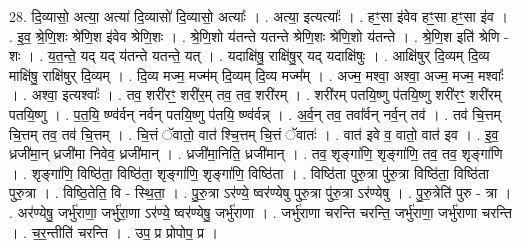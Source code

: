 \documentclass[17pt]{extarticle}
\begin{document}
28. दि॒व्यासो॒ अत्या॒ अत्या॑ दि॒व्यासो॑ दि॒व्यासो॒ अत्याः᳚ । . अत्या॒ इत्यत्याः᳚ । . हꣳ॒॒सा इ॑वेव हꣳ॒॒सा हꣳ॒॒सा इ॑व । . इ॒व॒ श्रे॒णि॒शः श्रे॑णि॒श इ॑वेव श्रेणि॒शः । . श्रे॒णि॒शो य॑तन्ते यतन्ते श्रेणि॒शः श्रे॑णि॒शो य॑तन्ते । . श्रे॒णि॒श इति॑ श्रेणि - शः । . य॒त॒न्ते॒ यद् यद् य॑तन्ते यतन्ते॒ यत् । . यदाक्षि॑षु॒ राक्षि॑षु॒र् यद् यदाक्षि॑षुः । . आक्षि॑षुर् दि॒व्यम् दि॒व्य माक्षि॑षु॒ राक्षि॑षुर् दि॒व्यम् । . दि॒व्य मज्म॒ मज्म॑म् दि॒व्यम् दि॒व्य मज्म᳚म् । . अज्म॒ मश्वा॒ अश्वा॒ अज्म॒ मज्म॒ मश्वाः᳚ । . अश्वा॒ इत्यश्वाः᳚ । . तव॒ शरी॑रꣳ॒॒ शरी॑र॒म् तव॒ तव॒ शरी॑रम् । . शरी॑रम् पतयि॒ष्णु प॑तयि॒ष्णु शरी॑रꣳ॒॒ शरी॑रम् पतयि॒ष्णु । . प॒त॒यि॒ ष्ण्व॑र्वन् नर्वन् पतयि॒ष्णु प॑तयि॒ ष्ण्व॑र्वन्न् । . अ॒र्व॒न् तव॒ तवा᳚र्वन् नर्व॒न् तव॑ । . तव॑ चि॒त्तम् चि॒त्तम् तव॒ तव॑ चि॒त्तम् । . चि॒त्तं ॅवातो॒ वात॑ श्चि॒त्तम् चि॒त्तं ॅवातः॑ । . वात॑ इवे व॒ वातो॒ वात॑ इव । . इ॒व॒ ध्रजी॑मा॒न् ध्रजी॑मा निवेव॒ ध्रजी॑मान् । . ध्रजी॑मा॒निति॒ ध्रजी॑मान् । . तव॒ शृङ्गा॑णि॒ शृङ्गा॑णि॒ तव॒ तव॒ शृङ्गा॑णि । . शृङ्गा॑णि॒ विष्ठि॑ता॒ विष्ठि॑ता॒ शृङ्गा॑णि॒ शृङ्गा॑णि॒ विष्ठि॑ता । . विष्ठि॑ता पुरु॒त्रा पु॑रु॒त्रा विष्ठि॑ता॒ विष्ठि॑ता पुरु॒त्रा । . विष्ठि॒तेति॒ वि - स्थि॒ता॒ । . पु॒रु॒त्रा ऽर॑ण्ये॒ ष्वर॑ण्येषु पुरु॒त्रा पु॑रु॒त्रा ऽर॑ण्येषु । . पु॒रु॒त्रेति॑ पुरु - त्रा । . अर॑ण्येषु॒ जर्भु॑राणा॒ जर्भु॑रा॒णा ऽर॑ण्ये॒ ष्वर॑ण्येषु॒ जर्भु॑राणा । . जर्भु॑राणा चरन्ति चरन्ति॒ जर्भु॑राणा॒ जर्भु॑राणा चरन्ति । . च॒र॒न्तीति॑ चरन्ति । . उप॒ प्र प्रोपोप॒ प्र । \newline
\end{document}
